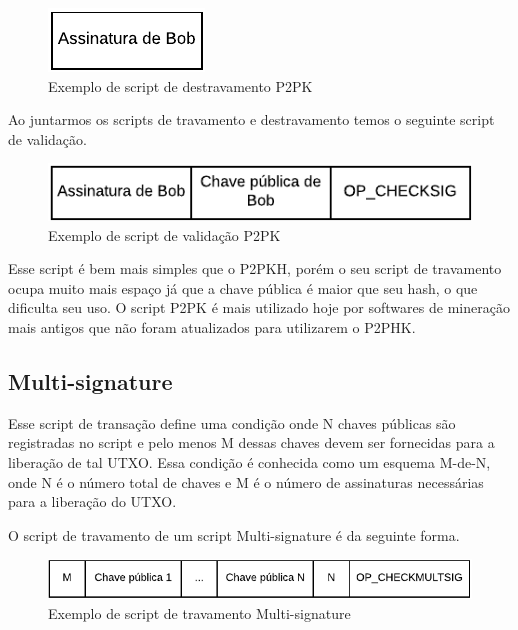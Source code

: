 \documentclass[conference,compsoc]{IEEEtran}
\begin{document}
\begin{figure}[H]
    \centering
    \includegraphics[keepaspectratio=true, scale=0.8]{img/P2PK_script_destravamento.pdf}
    \caption{Exemplo de script de destravamento P2PK}
    \label{fig:P2PK_Destravamento}
\end{figure}

Ao juntarmos os scripts de travamento e destravamento temos o seguinte script de validação.

\begin{figure}[H]
    \centering
    \includegraphics[keepaspectratio=true, scale=0.8]{img/P2PK_script_validacao.pdf}
    \caption{Exemplo de script de validação P2PK}
    \label{fig:P2PK_Validacao}
\end{figure}

Esse script é bem mais simples que o P2PKH, porém o seu script de travamento ocupa muito mais espaço já que a chave pública é maior que seu hash, o que dificulta seu uso. O script P2PK é mais utilizado hoje por softwares de mineração mais antigos que não foram atualizados para utilizarem o P2PHK.

\subsection*{Multi-signature}
\label{sec:Multi-signature}
Esse script de transação define uma condição onde N chaves públicas são registradas no script e pelo menos M dessas chaves devem ser fornecidas para a liberação de tal UTXO. Essa condição é conhecida como um esquema M-de-N, onde N é o número total de chaves e M é o número de assinaturas necessárias para a liberação do UTXO.

O script de travamento de um script Multi-signature é da seguinte forma.

\begin{figure}[H]
    \centering
    \includegraphics[keepaspectratio=true, scale=0.75]{img/Multsig_script_travamento.pdf}
    \caption{Exemplo de script de travamento Multi-signature}
    \label{fig:Multi-signature_Travamento}
\end{figure}
\end{document}
